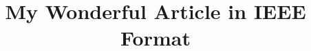 \pagestyle{empty}

\setlength{\textheight}{8.75in}
\setlength{\columnsep}{2.0pc}
\setlength{\textwidth}{6.8in}
\setlength{\footheight}{0.0in}
\setlength{\topmargin}{0.25in}
\setlength{\headheight}{0.0in}
\setlength{\headsep}{0.0in}
\setlength{\oddsidemargin}{-.19in}
\setlength{\parindent}{1pc}


\makeatletter
\def\@normalsize{\@setsize\normalsize{12pt}\xpt\@xpt
\abovedisplayskip 10pt plus2pt minus5pt\belowdisplayskip \abovedisplayskip
\abovedisplayshortskip \z@ plus3pt\belowdisplayshortskip 6pt plus3pt
minus3pt\let\@listi\@listI} 

\def\subsize{\@setsize\subsize{12pt}\xipt\@xipt}

\def\section{\@startsection {section}{1}{\z@}{24pt plus 2pt minus 2pt}
{12pt plus 2pt minus 2pt}{\large\bf}}

\def\subsection{\@startsection {subsection}{2}{\z@}{12pt plus 2pt minus 2pt}
{12pt plus 2pt minus 2pt}{\subsize\bf}}
\makeatother



\date{}

\title{\Large\bf My Wonderful Article in IEEE Format}

 
